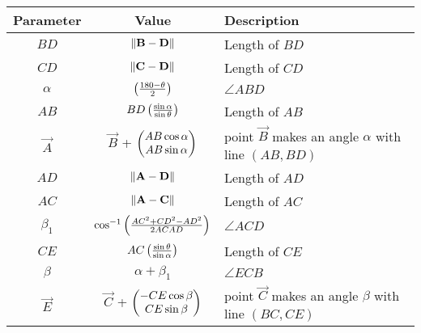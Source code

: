 \begin{tabular}{|c|c|p{5cm}|}
\hline
\textbf{Parameter} & \textbf{Value} & \textbf{Description} \\
\hline
	$BD$ & $\left\lVert\mathbf{B-D}\right\rVert$ & Length of $BD$ \\
\hline
	$CD$ & $\left\lVert\mathbf{C-D}\right\rVert$ & Length of $CD$ \\
\hline
	$\alpha$ & $\left(\frac{180 - \theta}{2}\right)$ & $\angle ABD$ \\
\hline
	$AB$ & $BD \left(\frac{\sin \alpha}{\sin \theta}\right)$ &  Length of $AB$ \\
\hline
	$\vec{A}$ & $\vec{B}$ + $\begin{pmatrix}AB \cos \alpha  \\ AB \sin \alpha\end{pmatrix}$ & point $\vec{B}$ makes an angle $\alpha$  with line $(AB ,BD)$  \\
\hline
	$AD$ & $\left\lVert\mathbf{A-D}\right\rVert$ & Length of $AD$ \\
\hline
	$AC$ & $\left\lVert\mathbf{A-C}\right\rVert$ & Length of $AC$ \\
\hline
	  
	$\beta_1$ & $\cos^{-1} \left(\frac{AC^2 +CD^2 - AD^2}{2 AC AD}\right)$ & $\angle ACD$ \\
\hline
	$CE$ & ${AC} \left(\frac{\sin \theta}{\sin \alpha}\right)$ &  Length of $CE$ \\
\hline
	$\beta$ & $\alpha + \beta_1$ & $\angle ECB$\\

\hline
	$\vec{E}$ & $\vec{C}$ + $\begin{pmatrix}-CE \cos \beta  \\ CE \sin \beta\end{pmatrix}$ & point $\vec{C}$ makes an angle $\beta$  with line $(BC ,CE)$  \\
\hline

\end{tabular}
